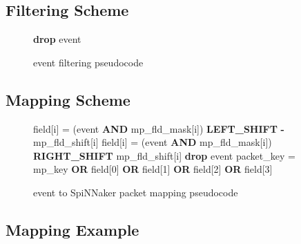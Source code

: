 \documentclass[11pt,a4paper,twoside]{article}
\begin{document}
\subsection{Filtering Scheme}


\begin{figure}[!ht]
	\centering
	\begin{minipage}{0.95\columnwidth}
		\begin{algorithm}[H]
			\caption{event filtering pseudocode}
			\begin{algorithmic}[1]
						\State \textbf{drop} event
					\EndIf
				\EndFor
			\end{algorithmic}
			\label{alg:filter}
		\end{algorithm}
	\end{minipage}
\end{figure}


\subsection{Mapping Scheme}


\begin{figure}[!ht]
	\centering
	\begin{minipage}{0.95\columnwidth}
		\begin{algorithm}[H]
			\caption{event to SpiNNaker packet mapping pseudocode}
			\begin{algorithmic}[1]
					    \State field[i] = (event \textbf{AND} mp\_fld\_mask[i]) \textbf{LEFT\_SHIFT} \textbf{-}mp\_fld\_shift[i]
				    \Else
					    \State field[i] = (event \textbf{AND} mp\_fld\_mask[i]) \textbf{RIGHT\_SHIFT} mp\_fld\_shift[i]
					\EndIf
						\State \textbf{drop} event
				    \EndIf
				\EndFor
					\State packet\_key = mp\_key \textbf{OR} field[0] \textbf{OR} field[1] \textbf{OR} field[2] \textbf{OR} field[3]
			    \EndIf
			\end{algorithmic}
			\label{alg:mapper}
		\end{algorithm}
	\end{minipage}
\end{figure}


\clearpage
\subsection{Mapping Example}
\end{document}
